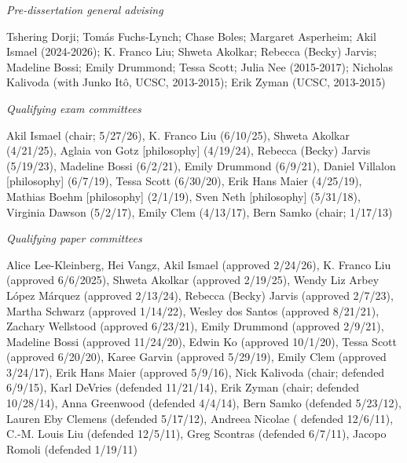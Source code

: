 \documentclass[12pt]{article}
\begin{document}
\noindent\emph{Pre-dissertation general advising\vspace{0.05in}}

\noindent
Tshering Dorji; 
 Tom\'as Fuchs-Lynch; 
 Chase Boles; 
 Margaret Asperheim; 
 Akil Ismael (2024-2026); 
 K. Franco Liu; 
 Shweta Akolkar; 
 Rebecca (Becky) Jarvis; 
 Madeline Bossi; 
 Emily Drummond; 
 Tessa Scott; 
 Julia Nee (2015-2017); 
  Nicholas Kalivoda (with Junko It\^o, UCSC, 2013-2015); 
 Erik Zyman (UCSC, 2013-2015) 


\medskip



\noindent\emph{Qualifying exam committees\vspace{0.05in}}


\noindent
Akil Ismael (chair; 5/27/26), 
K. Franco Liu (6/10/25), 
Shweta Akolkar (4/21/25), 
 Aglaia von Gotz [philosophy] (4/19/24), 
 Rebecca (Becky) Jarvis (5/19/23), 
 Madeline Bossi (6/2/21),  
 Emily Drummond (6/9/21), 
  Daniel Villalon [philosophy] (6/7/19), 
 Tessa Scott (6/30/20), 
 Erik Hans Maier (4/25/19), 
 Mathias Boehm [philosophy] (2/1/19), 
 Sven Neth [philosophy] (5/31/18), 
 Virginia Dawson (5/2/17), 
 Emily Clem (4/13/17), Bern Samko (chair; 1/17/13)    

\medskip



\noindent\emph{Qualifying paper committees\vspace{0.05in}}


\noindent
Alice Lee-Kleinberg, 
Hei Vangz, 
Akil Ismael (approved 2/24/26), 
K. Franco Liu (approved 6/6/2025), 
Shweta Akolkar (approved 2/19/25), 
 Wendy Liz Arbey L\'opez M\'arquez (approved 2/13/24), 
 Rebecca (Becky) Jarvis (approved 2/7/23), 
 Martha Schwarz  (approved 1/14/22), 
 Wesley dos Santos (approved 8/21/21), 
 Zachary Wellstood (approved 6/23/21), 
 Emily Drummond (approved 2/9/21), 
 Madeline Bossi (approved 11/24/20), 
 Edwin Ko  (approved 10/1/20), 
 Tessa Scott (approved 6/20/20), 
 Karee Garvin (approved 5/29/19), 
 Emily Clem (approved 3/24/17), 
 Erik Hans Maier (approved 5/9/16), 
 Nick Kalivoda (chair; defended 6/9/15), 
 Karl DeVries  (defended 11/21/14), 
 Erik Zyman (chair; defended 10/28/14), 
 Anna Greenwood (defended 4/4/14), 
 Bern Samko (defended 5/23/12),     
 Lauren Eby Clemens (defended 5/17/12), 
 Andreea Nicolae (%
defended 12/6/11), 
 C.-M. Louis Liu (defended 12/5/11), 
 Greg Scontras (defended 6/7/11), 
 Jacopo Romoli (defended 1/19/11) 
\end{document}

